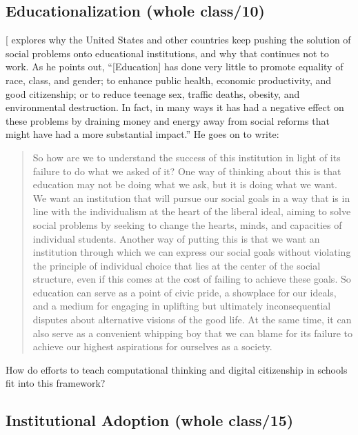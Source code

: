\subsection{Educationalization (whole class/10)}\label{educationalization-whole-class10}

{[}\protect[\hyperlink{b:Laba2008}{Laba2008}]{]} explores why the United States and other countries
keep pushing the solution of social problems onto educational
institutions, and why that continues not to work. As he points out,
``{[}Education{]} has done very little to promote equality of race,
class, and gender; to enhance public health, economic productivity, and
good citizenship; or to reduce teenage sex, traffic deaths, obesity, and
environmental destruction. In fact, in many ways it has had a negative
effect on these problems by draining money and energy away from social
reforms that might have had a more substantial impact.'' He goes on to
write:

\begin{quote}\setlength{\parindent}{0pt}
So how are we to understand the success of this institution in light
of its failure to do what we asked of it? One way of thinking about
this is that education may not be doing what we ask, but it is doing
what we want. We want an institution that will pursue our social goals
in a way that is in line with the individualism at the heart of the
liberal ideal, aiming to solve social problems by seeking to change
the hearts, minds, and capacities of individual students. Another way
of putting this is that we want an institution through which we can
express our social goals without violating the principle of individual
choice that lies at the center of the social structure, even if this
comes at the cost of failing to achieve these goals. So education can
serve as a point of civic pride, a showplace for our ideals, and a
medium for engaging in uplifting but ultimately inconsequential
disputes about alternative visions of the good life. At the same time,
it can also serve as a convenient whipping boy that we can blame for
its failure to achieve our highest aspirations for ourselves as a
society.
\end{quote}

How do efforts to teach computational thinking and digital citizenship
in schools fit into this framework?

\subsection{Institutional Adoption (whole class/15)}\label{institutional-adoption-whole-class15}

